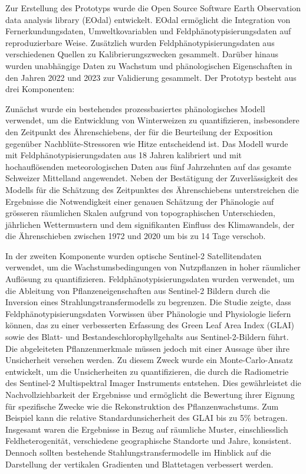 Zur Erstellung des Prototyps wurde die Open Source Software Earth Observation data analysis library (EOdal) entwickelt. EOdal ermöglicht die Integration von Fernerkundungsdaten, Umweltkovariablen und Feldphänotypisierungsdaten auf reproduzierbare Weise. Zusätzlich wurden Feldphänotypisierungsdaten aus verschiedenen Quellen zu Kalibrierungszwecken gesammelt. Darüber hinaus wurden unabhängige Daten zu Wachstum und phänologischen Eigenschaften in den Jahren 2022 und 2023 zur Validierung gesammelt. Der Prototyp besteht aus drei Komponenten:

Zunächst wurde ein bestehendes prozessbasiertes phänologisches Modell verwendet, um die Entwicklung von Winterweizen zu quantifizieren, insbesondere den Zeitpunkt des Ährenschiebens, der für die Beurteilung der Exposition gegenüber Nachblüte-Stressoren wie Hitze entscheidend ist. Das Modell wurde mit Feldphänotypisierungsdaten aus 18 Jahren kalibriert und mit hochauflösenden meteorologischen Daten aus fünf Jahrzehnten auf das gesamte Schweizer Mittelland angewendet. Neben der Bestätigung der Zuverlässigkeit des Modells für die Schätzung des Zeitpunktes des Ährenschiebens unterstreichen die Ergebnisse die Notwendigkeit einer genauen Schätzung der Phänologie auf grösseren räumlichen Skalen aufgrund von topographischen Unterschieden, jährlichen Wettermustern und dem signifikanten Einfluss des Klimawandels, der die Ährenschieben zwischen 1972 und 2020 um bis zu 14 Tage verschob.

In der zweiten Komponente wurden optische Sentinel-2 Satellitendaten verwendet, um die Wachstumsbedingungen von Nutzpflanzen in hoher räumlicher Auflösung zu quantifizieren. Feldphänotypisierungsdaten wurden verwendet, um die Ableitung von Pflanzeneigenschaften aus Sentinel-2 Bildern durch die Inversion eines Strahlungstransfermodells zu begrenzen. Die Studie zeigte, dass Feldphänotypisierungsdaten Vorwissen über Phänologie und Physiologie liefern können, das zu einer verbesserten Erfassung des Green Leaf Area Index (GLAI) sowie des Blatt- und Bestandeschlorophyllgehalts aus Sentinel-2-Bildern führt. Die abgeleiteten Pflanzenmerkmale müssen jedoch mit einer Aussage über ihre Unsicherheit versehen werden. Zu diesem Zweck wurde ein Monte-Carlo-Ansatz entwickelt, um die Unsicherheiten zu quantifizieren, die durch die Radiometrie des Sentinel-2 Multispektral Imager Instruments entstehen. Dies gewährleistet die Nachvollziehbarkeit der Ergebnisse und ermöglicht die Bewertung ihrer Eignung für spezifische Zwecke wie die Rekonstruktion des Pflanzenwachstums. Zum Beispiel kann die relative Standardunsicherheit des GLAI bis zu 5\% betragen. Insgesamt waren die Ergebnisse in Bezug auf räumliche Muster, einschliesslich Feldheterogenität, verschiedene geographische Standorte und Jahre, konsistent. Dennoch sollten bestehende Stahlungstransfermodelle im Hinblick auf die Darstellung der vertikalen Gradienten und Blattetagen verbessert werden.

